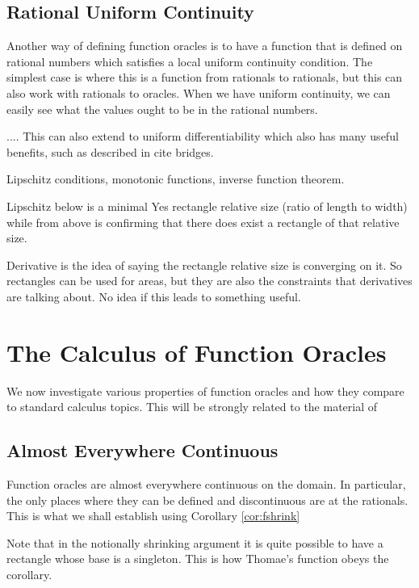 \documentclass[12pt]{article}
\begin{document}
\subsection{Rational Uniform Continuity}

Another way of defining function oracles is to have a function that is defined on rational numbers which satisfies a local uniform continuity condition. The simplest case is where this is a function from rationals to rationals, but this can also work with rationals to oracles. When we have uniform continuity, we can easily see what the values ought to be in the rational numbers. 

....
This can also extend to uniform differentiability which also has many useful benefits, such as described in cite bridges. 


Lipschitz conditions, monotonic functions, inverse function theorem. 

Lipschitz below is a minimal Yes rectangle relative size (ratio of length to width) while from above is confirming that there does exist a rectangle of that relative size. 

Derivative is the idea of saying the rectangle relative size is converging on it. So rectangles can be used for areas, but they are also the constraints that derivatives are talking about. No idea if this leads to something useful. 


\section{The Calculus of Function Oracles}

We now investigate various properties of function oracles and how they compare to standard calculus topics. This will be strongly related to the material of \cite{bridger}

\subsection{Almost Everywhere Continuous}

Function oracles are almost everywhere continuous on the domain. In particular, the only places where they can be defined and discontinuous are at the rationals. This is what we shall establish using Corollary \ref{cor:fshrink}

Note that in the notionally shrinking argument it is quite possible to have a rectangle whose base is a singleton. This is how Thomae's function obeys the corollary. 
\end{document}
